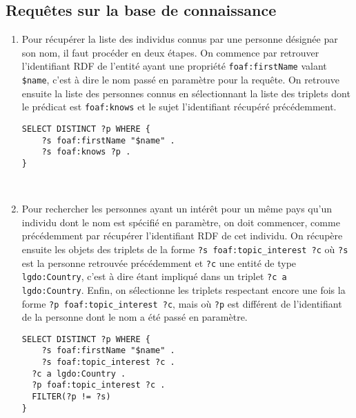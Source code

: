 \documentclass[a4paper,11pt]{article}
\begin{document}
\subsection{Requêtes sur la base de connaissance}
\begin{enumerate}
	\item Pour récupérer la liste des individus connus par une personne désignée par son nom, il faut procéder en deux étapes.
	On commence par retrouver l'identifiant RDF de l'entité ayant une propriété \lstinline$foaf:firstName$ valant \lstinline!$name!, c'est à dire le nom passé en paramètre pour la requête.
	On retrouve ensuite la liste des personnes connus en sélectionnant la liste des triplets dont le prédicat est \lstinline$foaf:knows$ et le sujet l'identifiant récupéré précédemment.
	\begin{lstlisting}[language=SPARQL]
SELECT DISTINCT ?p WHERE {
	?s foaf:firstName "$name" .
	?s foaf:knows ?p .
}
	\end{lstlisting}
	~\\\vspace*{-.5cm}
	\item Pour rechercher les personnes ayant un intérêt pour un même pays qu'un individu dont le nom est spécifié en paramètre, on doit commencer, comme précédemment par récupérer l'identifiant RDF de cet individu.
	On récupère ensuite les objets des triplets de la forme \lstinline$?s foaf:topic_interest ?c$ où \lstinline$?s$ est la personne retrouvée précédemment et \lstinline$?c$ une entité de type \lstinline$lgdo:Country$, c'est à dire étant impliqué dans un triplet \lstinline$?c a lgdo:Country$.
	Enfin, on sélectionne les triplets respectant encore une fois la forme \lstinline$?p foaf:topic_interest ?c$, mais où \lstinline$?p$ est différent de l'identifiant de la personne dont le nom a été passé en paramètre.
		\begin{lstlisting}[language=SPARQL]
SELECT DISTINCT ?p WHERE {
	?s foaf:firstName "$name" .
	?s foaf:topic_interest ?c .
  ?c a lgdo:Country .
  ?p foaf:topic_interest ?c .
  FILTER(?p != ?s)
}
	\end{lstlisting}
\end{enumerate}
\end{document}
